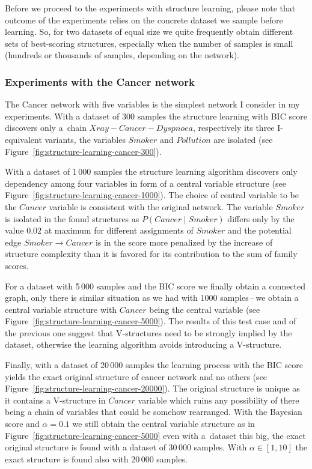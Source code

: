 \documentclass[english,cover]{fitthesis} %
\begin{document}
Before we proceed to the experiments with structure learning, please note that outcome of the experiments relies on the concrete dataset we sample before learning. So, for two datasets of equal size we quite frequently obtain different sets of best-scoring structures, especially when the number of samples is small (hundreds or thousands of samples, depending on the network).



\subsubsection{Experiments with the Cancer network}
The Cancer network with five variables is the simplest network I consider in my experiments. With a dataset of 300 samples the structure learning with BIC score discovers only a~chain $Xray - Cancer - Dyspnoea$, respectively its three I-equivalent variants, the variables $Smoker$ and $Pollution$ are isolated (see Figure~\ref{fig:structure-learning-cancer-300}).

With a dataset of 1\,000 samples the structure learning algorithm discovers only dependency among four variables in form of a central variable structure (see Figure~\ref{fig:structure-learning-cancer-1000}). The choice of central variable to be the $Cancer$ variable is consistent with the original network. The variable $Smoker$ is isolated in the found structures as $P(Cancer \mid Smoker)$ differs only by the value $0.02$ at maximum for different assignments of $Smoker$ and the potential edge $Smoker \rightarrow Cancer$ is in the score more penalized by the increase of structure complexity than it is favored for its contribution to the sum of family scores.

For a dataset with 5\,000 samples and the BIC score we finally obtain a connected graph, only there is similar situation as we had with 1000 samples\,--\,we obtain a central variable structure with $Cancer$ being the central variable (see Figure~\ref{fig:structure-learning-cancer-5000}). The results of this test case and of the previous one suggest that V-structures need to be strongly implied by the dataset, otherwise the learning algorithm avoids introducing a V-structure.

Finally, with a dataset of 20\,000 samples the learning process with the BIC score yields the exact original structure of cancer network and no others (see Figure~\ref{fig:structure-learning-cancer-20000}). The original structure is unique as it contains a V-structure in $Cancer$ variable which ruins any possibility of there being a chain of variables that could be somehow rearranged. With the Bayesian score and $\alpha=0.1$ we still obtain the central variable structure as in Figure~\ref{fig:structure-learning-cancer-5000} even with a~dataset this big, the exact original structure is found with a dataset of 30\,000 samples. With $\alpha \in [1, 10]$ the exact structure is found also with 20\,000 samples.
\end{document}
